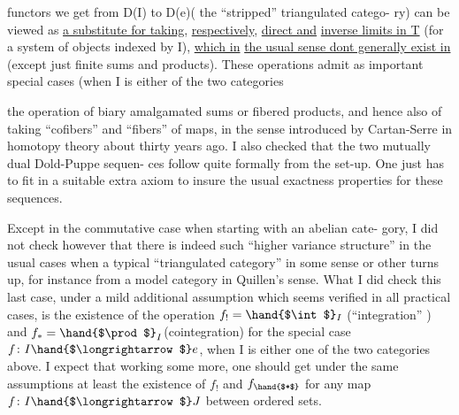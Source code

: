 
functors we get from D(I)  to  D(e)( the ``stripped'' triangulated catego-%
ry) can be viewed as \uline{a substitute for taking},  \uline{respectively},  \uline{direct and}
\uline{inverse limits in T} (for a system of objects indexed by I),  \uline{which in}
\uline{the usual sense dont generally exist in}  (except just finite sums and
products).  These operations admit as important special cases (when I
is either of the two categories

\margin{(**)}

the operation of \hand{(}biary\hand{)} amalgamated sums or fibered products,  and
hence also of taking ``cofibers'' and  ``fibers'' of maps,  in the 
 sense introduced by Cartan-Serre in homotopy theory about thirty
years ago.  I also checked that the two mutually dual Dold-Puppe sequen-%
ces follow quite formally from the set-up.  One just has to fit in a
suitable extra axiom to insure the usual exactness properties for these
sequences.

Except in the commutative case when starting with an abelian cate-%
gory, I did not check however that  there is indeed such ``higher
variance structure'' in the usual cases\hand{,} when a typical ``triangulated
category'' in some sense or other turns up,  for instance from a model
category in Quillen's sense.  What I did check  this last case,  under
a mild additional assumption which seems verified in all practical cases,
is the existence of the operation  $f_! = \hand{$\int$}_I$  (``integration'' ) and
$f_* = \hand{$\prod$}_I$(cointegration) for the special case $f\colon I \hand{$\longrightarrow$} e$,  when I is either
one of the two categories\inserted[typed]{(**)} above.  I expect that working some more,  one
should get under the same assumptions  at least the existence of
$f_!$ and $f_{\hand{$*$}}$  for any map $f\colon I \hand{$\longrightarrow$} J$ between ordered sets.

